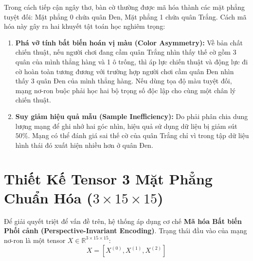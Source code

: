 \documentclass[11pt,a4paper]{report}
\begin{document}
Trong cách tiếp cận ngây thơ, bàn cờ thường được mã hóa thành các mặt phẳng tuyệt đối: Mặt phẳng 0 chứa quân Đen, Mặt phẳng 1 chứa quân Trắng. Cách mã hóa này gây ra hai khuyết tật toán học nghiêm trọng:
\begin{enumerate}
    \item \textbf{Phá vỡ tính bất biến hoán vị màu (Color Asymmetry):} Về bản chất chiến thuật, nếu người chơi đang cầm quân Trắng nhìn thấy thế cờ gồm 3 quân của mình thẳng hàng và 1 ô trống, thì áp lực chiến thuật và động lực đi cờ hoàn toàn tương đương với trường hợp người chơi cầm quân Đen nhìn thấy 3 quân Đen của mình thẳng hàng. Nếu dùng tọa độ màu tuyệt đối, mạng nơ-ron buộc phải học hai bộ trọng số độc lập cho cùng một chân lý chiến thuật.
    \item \textbf{Suy giảm hiệu quả mẫu (Sample Inefficiency):} Do phải phân chia dung lượng mạng để ghi nhớ hai góc nhìn, hiệu quả sử dụng dữ liệu bị giảm sút $50\%$. Mạng có thể đánh giá sai thế cờ của quân Trắng chỉ vì trong tập dữ liệu hình thái đó xuất hiện nhiều hơn ở quân Đen.
\end{enumerate}

\section{Thiết Kế Tensor 3 Mặt Phẳng Chuẩn Hóa ($3 \times 15 \times 15$)}

Để giải quyết triệt để vấn đề trên, hệ thống áp dụng cơ chế \textbf{Mã hóa Bất biến Phối cảnh (Perspective-Invariant Encoding)}. Trạng thái đầu vào của mạng nơ-ron là một tensor $X \in \mathbb{R}^{3 \times 15 \times 15}$:
\begin{equation}
    X = [X^{(0)}, X^{(1)}, X^{(2)}]
\end{equation}
\end{document}
